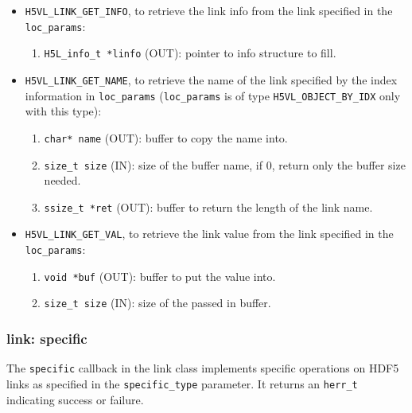 \begin{itemize}
\item \texttt{H5VL\_LINK\_GET\_INFO}, to retrieve the link info from the
  link specified in the \texttt{loc\_params}:
  \begin{enumerate}
  \item \texttt{H5L\_info\_t *linfo} (OUT): pointer to info structure to
    fill.
  \end{enumerate}

\item \texttt{H5VL\_LINK\_GET\_NAME}, to retrieve the name of the link
  specified by the index information in \texttt{loc\_params} (\texttt{loc\_params} is of type \texttt{H5VL\_OBJECT\_BY\_IDX} only with this
  type):
  \begin{enumerate}
  \item \texttt{char* name} (OUT): buffer to copy the name into.
  \item \texttt{size\_t size} (IN): size of the buffer name, if 0, return
    only the buffer size needed.
  \item \texttt{ssize\_t *ret} (OUT): buffer to return the length of the
    link name.
  \end{enumerate}

\item \texttt{H5VL\_LINK\_GET\_VAL}, to retrieve the link value from the
  link specified in the \texttt{loc\_params}:
  \begin{enumerate}
  \item \texttt{void *buf} (OUT): buffer to put the value into.
  \item \texttt{size\_t size} (IN): size of the passed in buffer.
  \end{enumerate}
\end{itemize}

\subsubsection{link: specific}
The \texttt{specific} callback in the link class implements specific operations on HDF5 links as specified in the \texttt{specific\_type} parameter. It returns an \texttt{herr\_t} indicating success or failure.\bigskip

